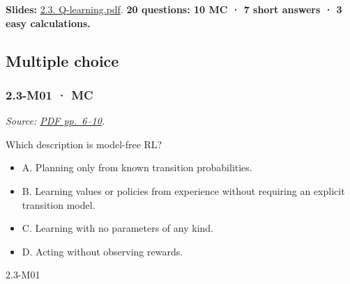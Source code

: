 \textbf{Slides:} \href{../Lecture\%20Slides/2.3.\%20Q-learning.pdf}{2.3.
Q-learning.pdf}. \textbf{20 questions: 10 MC · 7 short answers · 3 easy
calculations.}

\subsection{Multiple choice}\label{multiple-choice-5}

\noindent\begin{minipage}{\linewidth}

\subsubsection{2.3-M01 · MC}\label{m01-mc-5}

\emph{Source:
\href{../Lecture\%20Slides/2.3.\%20Q-learning.pdf\#page=6}{PDF
pp.~6--10}.}

Which description is model-free RL?

\begin{itemize}
\tightlist
\item
  A. Planning only from known transition probabilities.
\item
  B. Learning values or policies from experience without requiring an
  explicit transition model.
\item
  C. Learning with no parameters of any kind.
\item
  D. Acting without observing rewards.
\end{itemize}

\begin{solution}[8mm]{2.3-M01}

\end{solution}
\end{minipage}\par\medskip

